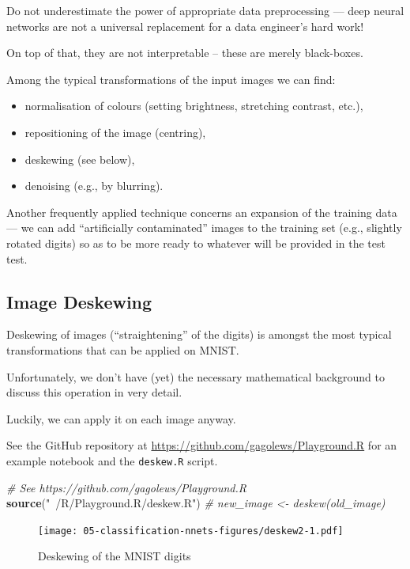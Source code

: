 \documentclass[10pt,b5paper,krantz1]{krantz}
\newenvironment{Shaded}{\begin{snugshade}}{\end{snugshade}}
\newcommand{\CommentTok}[1]{\textcolor[rgb]{0.37,0.37,0.37}{\textit{#1}}}
\newcommand{\KeywordTok}[1]{\textcolor[rgb]{0.27,0.27,0.27}{\textbf{#1}}}
\newcommand{\NormalTok}[1]{#1}
\newcommand{\StringTok}[1]{\textcolor[rgb]{0.5,0.5,0.5}{#1}}
\providecommand{\tightlist}{%
  \setlength{\itemsep}{0pt}\setlength{\parskip}{0pt}}
\begin{document}
Do not underestimate the power of appropriate data preprocessing ---
deep neural networks are not a universal replacement for a data engineer's hard work!

On top of that, they are not interpretable -- these are merely black-boxes.

Among the typical transformations of the input images we can find:

\begin{itemize}
\tightlist
\item
  normalisation of colours (setting brightness, stretching contrast, etc.),
\item
  repositioning of the image (centring),
\item
  deskewing (see below),
\item
  denoising (e.g., by blurring).
\end{itemize}

Another frequently applied technique concerns an expansion of the training data
--- we can add ``artificially contaminated'' images to the training
set (e.g., slightly rotated digits) so as to be more ready to whatever
will be provided in the test test.

\hypertarget{image-deskewing}{%
\subsection{Image Deskewing}\label{image-deskewing}}

Deskewing of images (``straightening'' of the digits)
is amongst the most typical transformations
that can be applied on MNIST.

Unfortunately, we don't have (yet) the necessary
mathematical background to discuss this operation
in very detail.

Luckily, we can apply it on each image anyway.

See the GitHub repository at \url{https://github.com/gagolews/Playground.R}
for an example notebook and the \texttt{deskew.R} script.

\begin{Shaded}
\begin{Highlighting}[]
\CommentTok{# See https://github.com/gagolews/Playground.R}
\KeywordTok{source}\NormalTok{(}\StringTok{"~/R/Playground.R/deskew.R"}\NormalTok{)}
\CommentTok{# new_image <- deskew(old_image)}
\end{Highlighting}
\end{Shaded}

\begin{figure}
\hypertarget{fig:deskew2}{%
\centering
\texttt{[image: 05-classification-nnets-figures/deskew2-1.pdf]}
\caption{Deskewing of the MNIST digits}\label{fig:deskew2}
}
\end{figure}
\end{document}
